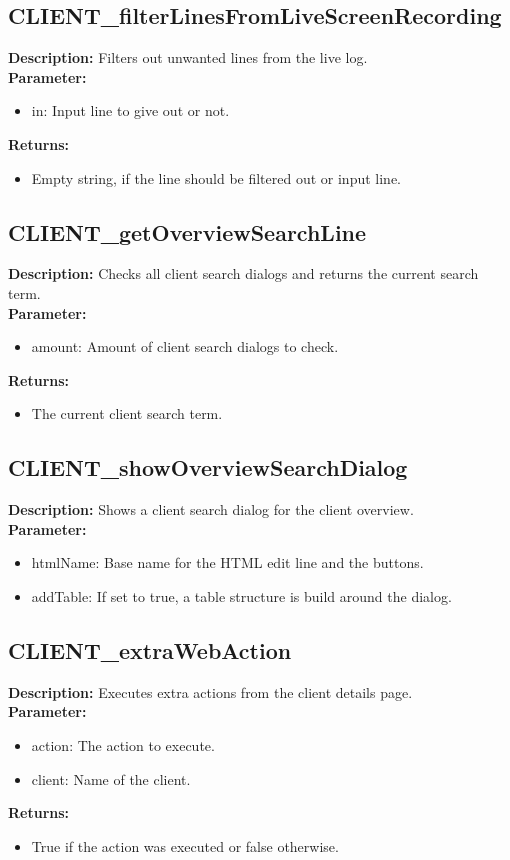 \subsection{CLIENT\_filterLinesFromLiveScreenRecording}
\textbf{Description:} Filters out unwanted lines from the live log.\\
\textbf{Parameter:}
\begin{itemize}
\item in: Input line to give out or not.
\end{itemize}
\textbf{Returns:}
\begin{itemize}
\item Empty string, if the line should be filtered out or input line.
\end{itemize}

\subsection{CLIENT\_getOverviewSearchLine}
\textbf{Description:} Checks all client search dialogs and returns the current search term.\\
\textbf{Parameter:}
\begin{itemize}
\item amount: Amount of client search dialogs to check.
\end{itemize}
\textbf{Returns:}
\begin{itemize}
\item The current client search term.
\end{itemize}

\subsection{CLIENT\_showOverviewSearchDialog}
\textbf{Description:} Shows a client search dialog for the client overview.\\
\textbf{Parameter:}
\begin{itemize}
\item htmlName: Base name for the HTML edit line and the buttons.
\item addTable: If set to true, a table structure is build around the dialog.
\end{itemize}

\subsection{CLIENT\_extraWebAction}
\textbf{Description:} Executes extra actions from the client details page.\\
\textbf{Parameter:}
\begin{itemize}
\item action: The action to execute.
\item client: Name of the client.
\end{itemize}
\textbf{Returns:}
\begin{itemize}
\item True if the action was executed or false otherwise.
\end{itemize}

